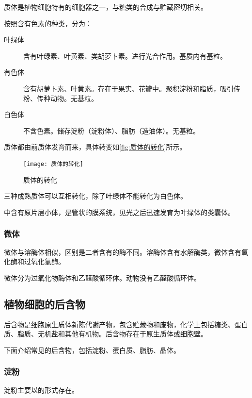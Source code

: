 质体是植物细胞特有的细胞器之一，与糖类的合成与贮藏密切相关。

按照含有色素的种类，分为：
\begin{description}
	\item[叶绿体] 含有叶绿素、叶黄素、类胡萝卜素。进行光合作用。基质内有基粒。
	\item[有色体] 含有胡萝卜素、叶黄素。存在于果实、花瓣中。聚积淀粉和脂质，吸引传粉、传种动物。无基粒。
	\item[白色体] 不含色素。储存淀粉（淀粉体）、脂肪（造油体）。无基粒。
\end{description}


质体都由前质体发育而来，具体转变如\autoref{fig:质体的转化}所示。

\begin{figure}[htbp]
	\centering
	\texttt{[image: 质体的转化]}
	\caption{质体的转化}
	\label{fig:质体的转化}
\end{figure}

三种成熟质体可以互相转化，除了叶绿体不能转化为白色体。

中含有原片层小体，是管状的膜系统，见光之后迅速发育为叶绿体的类囊体。

\subsubsection{微体}

微体与溶酶体相似，区别是二者含有的酶不同。溶酶体含有水解酶类，微体含有氧化酶和过氧化氢酶。

微体分为过氧化物酶体和乙醛酸循环体。动物没有乙醛酸循环体。

\subsection{植物细胞的后含物}

 后含物是细胞原生质体新陈代谢产物，包含贮藏物和废物，化学上包括糖类、蛋白质、脂质、无机盐和其他有机物。后含物存在于原生质体或细胞壁。
 
 下面介绍常见的后含物，包括淀粉、蛋白质、脂肪、晶体。
 
 \subsubsection{淀粉}
 
 淀粉主要以的形式存在。
 

